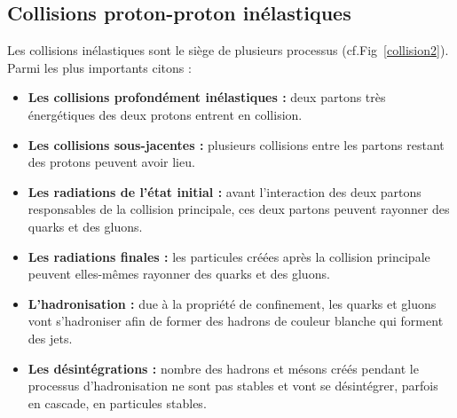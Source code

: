 \subsection{Collisions proton-proton inélastiques}
Les collisions inélastiques sont le siège de plusieurs processus (cf.Fig~\ref{collision2}). Parmi les plus importants citons :
\begin{itemize}[label=$\bullet$]
	\item \textbf{Les collisions profondément inélastiques :} deux partons très énergétiques des deux protons entrent en collision.
	\item \textbf{Les collisions sous-jacentes :} plusieurs collisions entre les partons restant des protons peuvent avoir lieu.
	\item \textbf{Les radiations de l'état initial :} avant l'interaction des deux partons responsables de la collision principale, ces deux partons peuvent rayonner des quarks et des gluons.
	\item \textbf{Les radiations finales :} les particules créées après la collision principale peuvent elles-mêmes rayonner des quarks et des gluons.
	\item \textbf{L'hadronisation :} due à la propriété de confinement, les quarks et gluons vont s'hadroniser afin de former des hadrons de couleur blanche qui forment des jets.
	\item \textbf{Les désintégrations :} nombre des hadrons et mésons créés pendant le processus d'hadronisation ne sont pas stables et vont se désintégrer, parfois en cascade, en particules stables.
\end{itemize}

